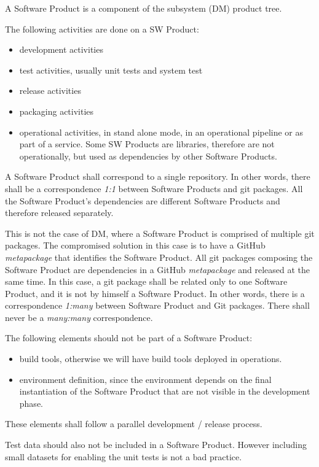 A Software Product is a component of the subsystem (\gls{DM}) product tree.

The following activities are done on a \gls{SW} Product:
\begin{itemize}
\item development activities
\item test activities, usually unit tests and system test
\item release activities
\item packaging activities
\item operational activities, in stand alone mode, in an operational pipeline or as part of a service. Some \gls{SW} Products are libraries, therefore are not operationally, but used as dependencies by other Software Products.
\end{itemize}

A Software Product shall correspond to a single repository.
In other  words, there shall be a correspondence \textit{1:1} between Software Products and git packages.
All the Software Product's dependencies are different Software Products and therefore released separately.

This is not the case of \gls{DM}, where a Software Product is comprised of multiple git packages.
The compromised solution in this case is to have a GitHub \textit{metapackage} that identifies the Software Product.
All git packages composing the Software Product are dependencies in a GitHub \textit{metapackage} and released at the same time.
In this case, a git package shall be related only to one Software Product, and it is not by himself a Software Product.
In other words, there is a correspondence \textit{1:many} between Software Product and Git packages.
There shall never be a \textit{many:many} correspondence.

The following elements should not be part of a Software Product:

\begin{itemize}
\item build tools, otherwise we will have build tools deployed in operations.
\item environment definition, since the environment depends on the final instantiation of the Software Product that are not visible in the development phase.
\end{itemize}

These elements shall follow a parallel development / release process.

Test data should also not be included in a Software Product. However including small datasets for enabling the unit tests is not a bad practice.

